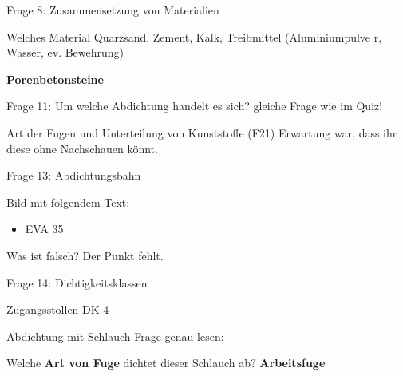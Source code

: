 \begin{frame}{Frage 8: Zusammensetzung von Materialien}
    \begin{block}{Welches Material}
        Quarzsand,
Zement, Kalk,
Treibmittel
(Aluminiumpulve
r, Wasser, ev.
Bewehrung)
\end{block}

\pause
    \vspace{\baselineskip} 

    \textbf{Porenbetonsteine}

\end{frame}

\begin{frame}{Frage 11: Um welche Abdichtung handelt es sich?}
   gleiche Frage wie im Quiz!
\end{frame}

\begin{frame}{Art der Fugen und Unterteilung von Kunststoffe (F21)}
    Erwartung war, dass ihr diese ohne Nachschauen könnt.

\end{frame}

\begin{frame}{Frage 13: Abdichtungsbahn}

    \begin{block}{Bild mit folgendem Text:}
        \begin{itemize}
            \item EVA 35
        \end{itemize}
    \end{block}

\begin{block}{Was ist falsch?}
    \pause
    Der Punkt fehlt.
\end{block}
\end{frame}

\begin{frame}{Frage 14: Dichtigkeitsklassen}
    \begin{block}{Zugangsstollen}
        \pause
        DK 4
    \end{block}

\end{frame}

\begin{frame}{Abdichtung mit Schlauch}
    Frage genau lesen: 

    Welche \textbf{Art von Fuge} dichtet dieser Schlauch ab?
    \pause
    \vspace{\baselineskip}
    \textbf{Arbeitsfuge}

\end{frame}

